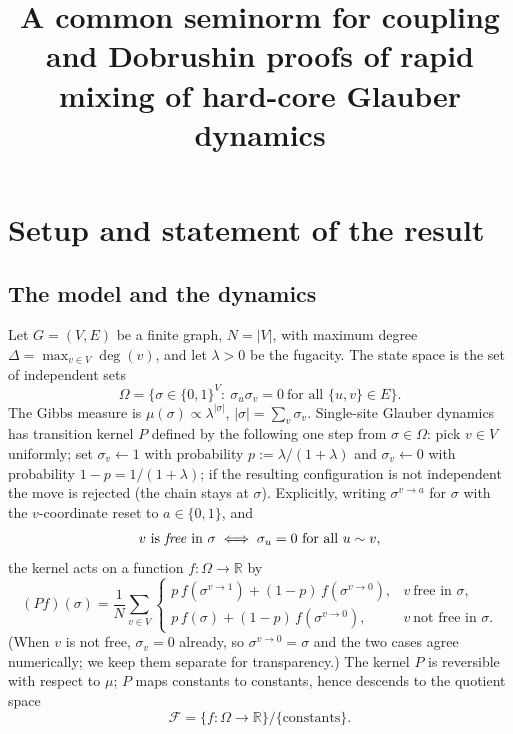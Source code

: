 \documentclass{amsart}
\newcommand{\Om}{\Omega}
\newcommand{\R}{\mathbb{R}}
\begin{document}
\title{A common seminorm for coupling and Dobrushin proofs of rapid mixing
of hard-core Glauber dynamics}
\maketitle

\section{Setup and statement of the result}

\subsection{The model and the dynamics}
Let $G=(V,E)$ be a finite graph, $N=|V|$, with maximum degree
$\Delta=\max_{v\in V}\deg(v)$, and let $\lambda>0$ be the fugacity. The state
space is the set of independent sets
\[
\Om=\Big\{\sigma\in\{0,1\}^V:\ \sigma_u\sigma_v=0\ \text{for all }\{u,v\}\in E\Big\}.
\]
The Gibbs measure is $\mu(\sigma)\propto\lambda^{|\sigma|}$, $|\sigma|=\sum_v\sigma_v$.
Single-site Glauber dynamics has transition kernel $P$ defined by the following
one step from $\sigma\in\Om$: pick $v\in V$ uniformly; set
$\sigma_v\leftarrow1$ with probability $p:=\lambda/(1+\lambda)$ and
$\sigma_v\leftarrow0$ with probability $1-p=1/(1+\lambda)$; if the resulting
configuration is not independent the move is rejected (the chain stays at
$\sigma$). Explicitly, writing $\sigma^{v\to a}$ for $\sigma$ with the $v$-coordinate
reset to $a\in\{0,1\}$, and
\[
\text{$v$ is \emph{free} in $\sigma$}\iff \sigma_u=0\ \text{for all }u\sim v ,
\]
the kernel acts on a function $f:\Om\to\R$ by
\begin{equation}\label{eq:Pf}
(Pf)(\sigma)=\frac1N\sum_{v\in V}
\begin{cases}
p\,f(\sigma^{v\to1})+(1-p)\,f(\sigma^{v\to0}), & v\ \text{free in }\sigma,\\[2pt]
p\,f(\sigma)+(1-p)\,f(\sigma^{v\to0}), & v\ \text{not free in }\sigma .
\end{cases}
\end{equation}
(When $v$ is not free, $\sigma_v=0$ already, so $\sigma^{v\to0}=\sigma$ and the
two cases agree numerically; we keep them separate for transparency.) The kernel
$P$ is reversible with respect to $\mu$; $P$ maps constants to constants, hence
descends to the quotient space
\[
\mathcal F=\{f:\Om\to\R\}/\{\text{constants}\}.
\]
\end{document}
